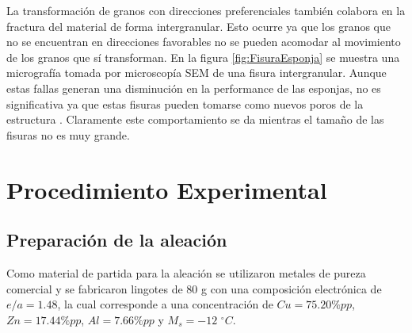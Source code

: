 \documentclass[a4paper,12pt,fleqn,twoside,openany]{book}
\begin{document}
La transformación de granos con direcciones preferenciales también colabora en la fractura del material de forma intergranular. Esto ocurre ya que los granos que no se encuentran
en direcciones favorables no se pueden acomodar al movimiento de los granos que sí transforman. En la figura \ref{fig:FisuraEsponja} se muestra una micrografía tomada por microscopía SEM de una fisura intergranular. Aunque estas fallas generan una disminución en la performance de las esponjas,
no es significativa ya que estas fisuras pueden tomarse como nuevos poros de la estructura \cite{bertolino2010}. Claramente este comportamiento se da mientras el tamaño de las fisuras no es muy 
grande.
% 
% 



\chapter{Procedimiento Experimental}



\section{Preparación de la aleación} \label{preparacion_aleacion}


Como material de partida para la aleación se utilizaron metales de pureza comercial y se fabricaron lingotes de 80 g con una composición electrónica de 
$e/a=1.48$, la cual corresponde a una concentración de $Cu=75.20 \% pp$, $Zn= 17.44 \% pp$, $Al=7.66 \%pp$ y $M_s=-12$ $^\circ C$.   
\end{document}
